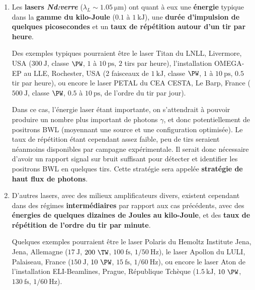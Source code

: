 \begin{refsection}
\begin{enumerate}
\item 
    Les \textbf{lasers \textit{Nd:verre}} ($\lambda_L \sim 1.05 ~ \si{\um}$) ont quant à eux une \textbf{énergie} typique dans la \textbf{gamme du kilo-Joule} ($0.1$ à $1 ~ \si{\kJ}$), une \textbf{durée d'impulsion de quelques picosecondes} et un \textbf{taux de répétition autour d'un tir par heure}.

    Des exemples typiques pourraient être le laser Titan \parencite{laser_titan} du LNLL, Livermore, USA ($300 ~ \si{\J}$, classe $\si{\PW}$, $1$ à $10 ~ \si{\ps}$, $2$ tirs par heure), l'installation OMEGA-EP \parencite{laser_omega} au LLE, Rochester, USA (2 faisceaux de $1 ~ \si{\kJ}$, classe $\si{\PW}$, $1$ à $10 ~ \si{\ps}$, $0.5$ tir par heure), ou encore le laser PETAL \parencite{laser_petal} du CEA CESTA, Le Barp, France ($500 ~ \si{\J}$, classe $\si{\PW}$, $0.5$ à $10~ \si{\ps}$, de l'ordre du tir par jour).

    Dans ce cas, l'énergie laser étant importante, on s'attendrait à pouvoir produire un nombre plus important de photons $\gamma$, et donc potentiellement de positrons BWL (moyennant une source et une configuration optimisée). Le taux de répétition étant cependant assez faible, peu de tirs seraient néanmoins disponibles par campagne expérimentale. Il serait donc nécessaire d'avoir un rapport signal sur bruit suffisant pour détecter et identifier les positrons BWL en quelques tirs. Cette stratégie sera appelée \textbf{stratégie de haut flux de photons}.

\item 
    D'autres lasers, avec des milieux amplificateurs divers, existent cependant dans des régimes \textbf{intermédiaires} par rapport aux cas précédents, avec des \textbf{énergies de quelques dizaines de Joules au kilo-Joule}, et des \textbf{taux de répétition de l'ordre du tir par minute}.

    Quelques exemples pourraient être le laser Polaris \parencite{laser_polaris} du Hemoltz Institute Jena, Jena, Allemagne ($17 ~ \si{\J}$, $200 ~ \si{\TW}$, $100 ~ \si{\fs}$, $1/50 ~ \si{\Hz}$), le laser Apollon \parencite{laser_apollon} du LULI, Palaiseau, France ($150 ~ \si{\J}$, $10 ~ \si{\PW}$, $15 ~ \si{\fs}$, $1/60 ~ \si{\Hz}$), ou encore le laser Aton \parencite{laser_aton} de l'installation ELI-Beamlines, Prague, République Tchèque ($1.5 ~ \si{\kJ}$, $10 ~ \si{\PW}$, $130 ~ \si{\fs}$, $1/60 ~ \si{\Hz}$).
    

\end{enumerate}
\end{refsection}
